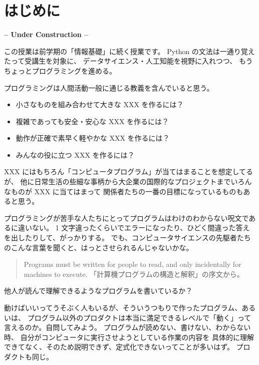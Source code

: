 \section*{ はじめに }

{\center\large\bf -- Under Construction --\\}

この授業は前学期の「情報基礎」に続く授業です。
Python の文法は一通り覚えたって受講生を対象に、
データサイエンス・人工知能を視野に入れつつ、
もうちょっとプログラミングを進める。

プログラミングは人間活動一般に通じる教義を含んでいると思う。

\begin{itemize}
\item 小さなものを組み合わせて大きな XXX を作るには？
\item 複雑であっても安全・安心な XXX を作るには？
\item 動作が正確で素早く軽やかな XXX を作るには？
\item みんなの役に立つ XXX を作るには？
\end{itemize}
%
XXX にはもちろん「コンピュータプログラム」が当てはまることを想定してるが、
他に日常生活の些細な事柄から大企業の国際的なプロジェクトまでいろんなものが XXX に当てはまって
関係者たちの一番の目標になっているものもあると思う。

プログラミングが苦手な人たちにとってプログラムはわけのわからない呪文であるに違いない。
1 文字違ったくらいでエラーになったり、ひどく間違った答えを出したりして、がっかりする。
でも、コンピュータサイエンスの先駆者たちのこんな言葉を聞くと、はっとさせられるんじゃないかな。

\begin{quote}
Programs must be written for people to read,
and only incidentally for machines to execute.
「計算機プログラムの構造と解釈」の序文から。
\end{quote}

他人が読んで理解できるようなプログラムを書いているか？

動けばいいってうそぶく人もいるが、そういうつもりで作ったプログラム、あるいは、
プログラム以外のプロダクトは本当に満足できるレベルで「動く」って言えるのか。自問してみよう。
プログラムが読めない、書けない、わからない時、
自分がコンピュータに実行させようとしている作業の内容を
具体的に理解できてなく、そのため説明できず、定式化できないってことが多いはず。
プロダクトも同じ。

